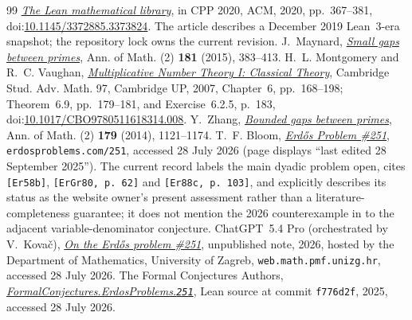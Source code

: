\documentclass[11pt]{article}
\begin{document}
\begin{thebibliography}{99}
  \href{https://doi.org/10.1145/3372885.3373824}
  {\emph{The Lean mathematical library}},
  in CPP 2020, ACM, 2020, pp.~367--381,
  doi:\href{https://doi.org/10.1145/3372885.3373824}
  {10.1145/3372885.3373824}.  The article describes a December 2019
  Lean~3-era snapshot; the repository lock owns the current revision.
 J.~Maynard,
  \href{https://doi.org/10.4007/annals.2015.181.1.7}
  {\emph{Small gaps between primes}},
  Ann. of Math. (2) \textbf{181} (2015), 383--413.
 H.~L. Montgomery and R.~C. Vaughan,
  \href{https://doi.org/10.1017/CBO9780511618314.008}
  {\emph{Multiplicative Number Theory I: Classical Theory}},
  Cambridge Stud. Adv. Math. 97, Cambridge UP, 2007,
  Chapter~6, pp.~168--198; Theorem~6.9, pp.~179--181, and
  Exercise~6.2.5, p.~183,
  doi:\href{https://doi.org/10.1017/CBO9780511618314.008}
  {10.1017/CBO9780511618314.008}.
 Y.~Zhang,
  \href{https://doi.org/10.4007/annals.2014.179.3.7}
  {\emph{Bounded gaps between primes}},
  Ann. of Math. (2) \textbf{179} (2014), 1121--1174.
 T.~F. Bloom,
  \href{https://www.erdosproblems.com/251}{\emph{Erd\H{o}s Problem \#251}},
  \texttt{erdosproblems.com/251}, accessed 28 July 2026 (page displays
  ``last edited 28 September 2025'').  The current record labels the main
  dyadic problem open, cites \texttt{[Er58b]}, \texttt{[ErGr80, p.~62]} and
  \texttt{[Er88c, p.~103]}, and explicitly describes its status as the
  website owner's present assessment rather than a literature-completeness
  guarantee; it does not mention the 2026 counterexample in
  \cite{kovac2026} to the adjacent variable-denominator conjecture.
 ChatGPT~5.4 Pro (orchestrated by V.~Kova\v{c}),
  \href{https://web.math.pmf.unizg.hr/~vjekovac/files/Erdos_problem_251.pdf}
  {\emph{On the Erd\H{o}s problem \#251}},
  unpublished note, 2026, hosted by the Department of Mathematics, University
  of Zagreb, \texttt{web.math.pmf.unizg.hr}, accessed 28 July 2026.
 The Formal Conjectures Authors,
  \href{https://github.com/google-deepmind/formal-conjectures/blob/f776d2f2039351b00737ffcafb9d7d7666e1d9af/FormalConjectures/ErdosProblems/251.lean}
  {\emph{FormalConjectures.ErdosProblems.\texttt{251}}},
  Lean source at commit \texttt{f776d2f}, 2025, accessed 28 July 2026.
\end{thebibliography}

\companionpapercontext
\end{document}
